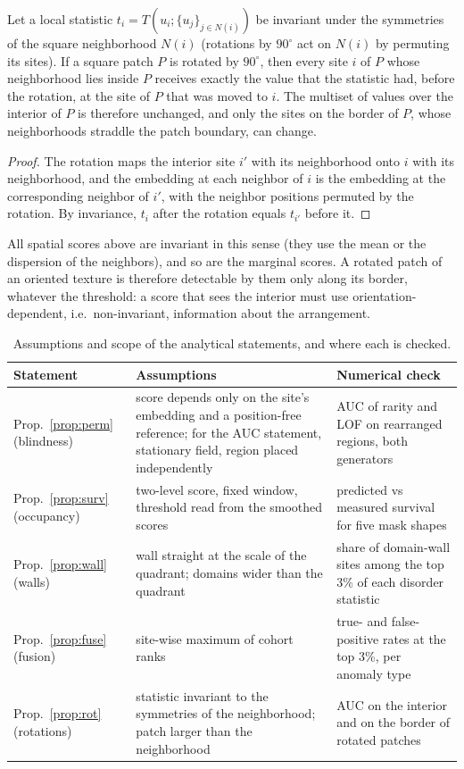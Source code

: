 \begin{proposition}
\label{prop:rot}
Let a local statistic $t_i=T(u_i;\{u_j\}_{j\in N(i)})$ be invariant under the symmetries of the square neighborhood $N(i)$ (rotations by $90^\circ$ act on $N(i)$ by permuting its sites). If a square patch $P$ is rotated by $90^\circ$, then every site $i$ of $P$ whose neighborhood lies inside $P$ receives exactly the value that the statistic had, before the rotation, at the site of $P$ that was moved to $i$. The multiset of values over the interior of $P$ is therefore unchanged, and only the sites on the border of $P$, whose neighborhoods straddle the patch boundary, can change.
\end{proposition}
\begin{proof}
The rotation maps the interior site $i'$ with its neighborhood onto $i$ with its neighborhood, and the embedding at each neighbor of $i$ is the embedding at the corresponding neighbor of $i'$, with the neighbor positions permuted by the rotation. By invariance, $t_i$ after the rotation equals $t_{i'}$ before it.
\end{proof}
All spatial scores above are invariant in this sense (they use the mean or the dispersion of the neighbors), and so are the marginal scores. A rotated patch of an oriented texture is therefore detectable by them only along its border, whatever the threshold: a score that sees the interior must use orientation-dependent, i.e.\ non-invariant, information about the arrangement.

\begin{table}[t]
\caption{Assumptions and scope of the analytical statements, and where each is checked.}
\label{tab:props}
\centering\small
\begin{tabular}{p{2.6cm}p{6.2cm}p{4.0cm}}
\toprule
Statement & Assumptions & Numerical check\\
\midrule
Prop.~\ref{prop:perm} (blindness) & score depends only on the site's embedding and a position-free reference; for the AUC statement, stationary field, region placed independently & AUC of rarity and LOF on rearranged regions, both generators\\
Prop.~\ref{prop:surv} (occupancy) & two-level score, fixed window, threshold read from the smoothed scores & predicted vs measured survival for five mask shapes\\
Prop.~\ref{prop:wall} (walls) & wall straight at the scale of the quadrant; domains wider than the quadrant & share of domain-wall sites among the top 3\% of each disorder statistic\\
Prop.~\ref{prop:fuse} (fusion) & site-wise maximum of cohort ranks & true- and false-positive rates at the top 3\%, per anomaly type\\
Prop.~\ref{prop:rot} (rotations) & statistic invariant to the symmetries of the neighborhood; patch larger than the neighborhood & AUC on the interior and on the border of rotated patches\\
\bottomrule
\end{tabular}
\end{table}
